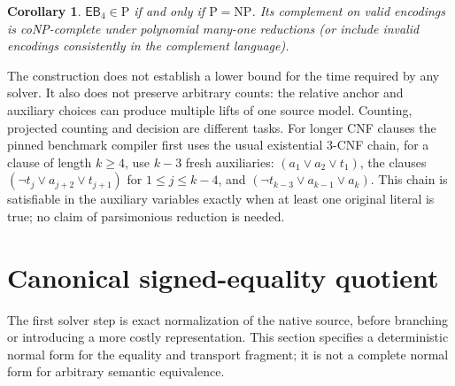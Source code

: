 \documentclass[11pt,letterpaper]{article}
\newtheorem{corollary}[theorem]{Corollary}
\theoremstyle{definition}
\newcommand{\EB}{\ensuremath{\mathsf{EB}_4}}
\begin{document}
\begin{corollary}\label{cor:pnp}
\(\EB\in\mathrm P\) if and only if \(\mathrm P=\mathrm{NP}\). Its complement on valid encodings is coNP-complete under polynomial many-one reductions (or include invalid encodings consistently in the complement language).
\end{corollary}
The construction does not establish a lower bound for the time required by any solver. It also does not preserve arbitrary counts: the relative anchor and auxiliary choices can produce multiple lifts of one source model. Counting, projected counting and decision are different tasks. For longer CNF clauses the pinned benchmark compiler first uses the usual existential 3-CNF chain, for a clause of length $k\ge4$, use $k-3$ fresh auxiliaries: $(a_1\lor a_2\lor t_1)$, the clauses $(\neg t_j\lor a_{j+2}\lor t_{j+1})$ for $1\le j\le k-4$, and $(\neg t_{k-3}\lor a_{k-1}\lor a_k)$. This chain is satisfiable in the auxiliary variables exactly when at least one original literal is true; no claim of parsimonious reduction is needed.

\section{Canonical signed-equality quotient}\label{sec:quotient}
The first solver step is exact normalization of the native source, before branching or introducing a more costly representation. This section specifies a deterministic normal form for the equality and transport fragment; it is not a complete normal form for arbitrary semantic equivalence.
\end{document}
